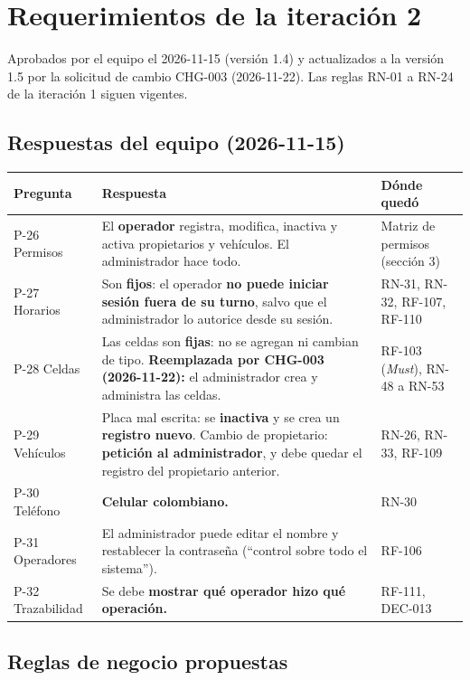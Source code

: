 \section{Requerimientos de la iteración 2}
Aprobados por el equipo el 2026-11-15 (versión 1.4) y actualizados a la versión 1.5 por la solicitud de cambio CHG-003 (2026-11-22). Las reglas RN-01 a RN-24 de la iteración 1 siguen vigentes.

\subsection{Respuestas del equipo (2026-11-15)}

\begin{longtable}{>{\raggedright\arraybackslash}p{2.4000000000000004cm}>{\raggedright\arraybackslash}p{9.9cm}>{\raggedright\arraybackslash}p{2.1cm}}
\toprule
\textbf{Pregunta} & \textbf{Respuesta} & \textbf{Dónde quedó}\\
\midrule\endhead
P-26 Permisos & El \textbf{operador} registra, modifica, inactiva y activa propietarios y vehículos. El administrador hace todo. & Matriz de permisos (sección 3)\\
P-27 Horarios & Son \textbf{fijos}: el operador \textbf{no puede iniciar sesión fuera de su turno}, salvo que el administrador lo autorice desde su sesión. & RN-31, RN-32, RF-107, RF-110\\
P-28 Celdas & Las celdas son \textbf{fijas}: no se agregan ni cambian de tipo. \textbf{Reemplazada por CHG-003 (2026-11-22):} el administrador crea y administra las celdas. & RF-103 (\emph{Must}), RN-48 a RN-53\\
P-29 Vehículos & Placa mal escrita: se \textbf{inactiva} y se crea un \textbf{registro nuevo}. Cambio de propietario: \textbf{petición al administrador}, y debe quedar el registro del propietario anterior. & RN-26, RN-33, RF-109\\
P-30 Teléfono & \textbf{Celular colombiano.} & RN-30\\
P-31 Operadores & El administrador puede editar el nombre y restablecer la contraseña (``control sobre todo el sistema''). & RF-106\\
P-32 Trazabilidad & Se debe \textbf{mostrar qué operador hizo qué operación.} & RF-111, DEC-013\\
\bottomrule
\end{longtable}




\subsection{Reglas de negocio propuestas}

